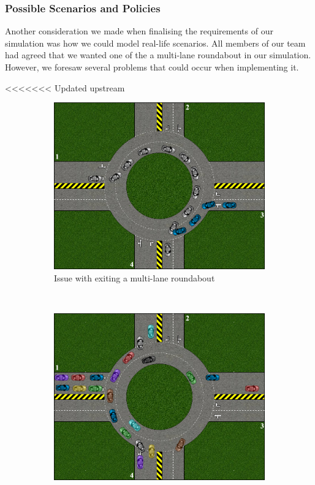 \documentclass{article}
\begin{document}
	\subsubsection{Possible Scenarios and Policies}
	
	Another consideration we made when finalising the requirements of our simulation was how we could model real-life scenarios. All members of our team had agreed that we wanted one of the  a multi-lane roundabout in our simulation. However, we foresaw several problems that could occur when implementing it. 
	
<<<<<<< Updated upstream
\begin{figure}
    \centering
    \begin{subfigure}[h]{0.5\textwidth}
        \includegraphics[width=\textwidth]{CarCrash3}
        \caption{Issue with exiting a multi-lane roundabout}
        \label{carCrash3}
    \end{subfigure}%
    ~ %
    \begin{subfigure}[h ]{0.5\textwidth}
        \includegraphics[width=\textwidth]{SteadyFlow}

\end{subfigure}
\end{figure}
\end{document}
